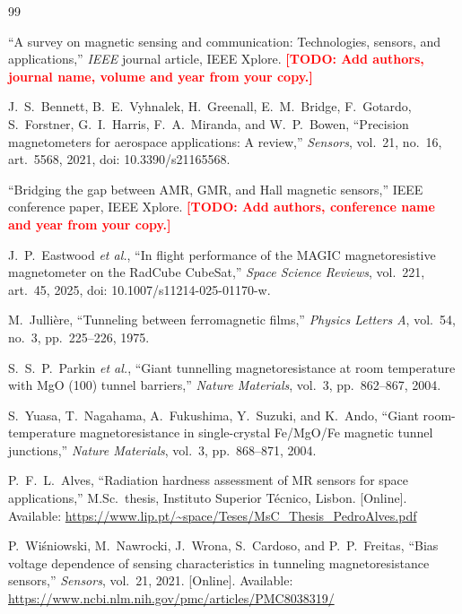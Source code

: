 \documentclass[12pt,a4paper]{article}
\newcommand{\todo}[1]{\textcolor{red}{\textbf{[TODO: #1]}}}
\begin{document}


\clearpage


\begin{thebibliography}{99}
\sloppy

``A survey on magnetic sensing and communication: Technologies, sensors, and applications,'' \emph{IEEE} journal article, IEEE Xplore. \todo{Add authors, journal name, volume and year from your copy.}

J.\ S.\ Bennett, B.\ E.\ Vyhnalek, H.\ Greenall, E.\ M.\ Bridge, F.\ Gotardo, S.\ Forstner, G.\ I.\ Harris, F.\ A.\ Miranda, and W.\ P.\ Bowen, ``Precision magnetometers for aerospace applications: A review,'' \emph{Sensors}, vol.~21, no.~16, art.~5568, 2021, doi: 10.3390/s21165568.

``Bridging the gap between AMR, GMR, and Hall magnetic sensors,'' IEEE conference paper, IEEE Xplore. \todo{Add authors, conference name and year from your copy.}

J.\ P.\ Eastwood \emph{et al.}, ``In flight performance of the MAGIC magnetoresistive magnetometer on the RadCube CubeSat,'' \emph{Space Science Reviews}, vol.~221, art.~45, 2025, doi: 10.1007/s11214-025-01170-w.

M.\ Julli\`ere, ``Tunneling between ferromagnetic films,'' \emph{Physics Letters A}, vol.~54, no.~3, pp.~225--226, 1975.

S.\ S.\ P.\ Parkin \emph{et al.}, ``Giant tunnelling magnetoresistance at room temperature with MgO (100) tunnel barriers,'' \emph{Nature Materials}, vol.~3, pp.~862--867, 2004.

S.\ Yuasa, T.\ Nagahama, A.\ Fukushima, Y.\ Suzuki, and K.\ Ando, ``Giant room-temperature magnetoresistance in single-crystal Fe/MgO/Fe magnetic tunnel junctions,'' \emph{Nature Materials}, vol.~3, pp.~868--871, 2004.

P.\ F.\ L.\ Alves, ``Radiation hardness assessment of MR sensors for space applications,'' M.Sc.\ thesis, Instituto Superior T\'ecnico, Lisbon. [Online]. Available: \url{https://www.lip.pt/~space/Teses/MsC_Thesis_PedroAlves.pdf}

P.\ Wi\'sniowski, M.\ Nawrocki, J.\ Wrona, S.\ Cardoso, and P.\ P.\ Freitas, ``Bias voltage dependence of sensing characteristics in tunneling magnetoresistance sensors,'' \emph{Sensors}, vol.~21, 2021. [Online]. Available: \url{https://www.ncbi.nlm.nih.gov/pmc/articles/PMC8038319/}


\end{thebibliography}
\end{document}
